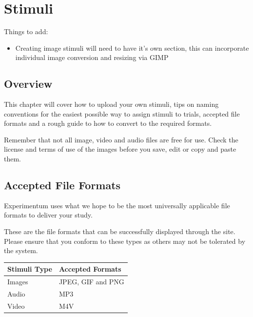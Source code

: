 \documentclass[]{book}
\providecommand{\tightlist}{%
  \setlength{\itemsep}{0pt}\setlength{\parskip}{0pt}}
\begin{document}
\hypertarget{stimuli}{\chapter{Stimuli}\label{stimuli}}

\begin{warning}
Things to add:

\begin{itemize}
\tightlist
\item
  Creating image stimuli will need to have it's own section, this can
  incorporate individual image conversion and resizing via GIMP
\end{itemize}
\end{warning}

\section{Overview}\label{overview-1}

This chapter will cover how to upload your own stimuli, tips on naming
conventions for the easiest possible way to assign stimuli to trials,
accepted file formats and a rough guide to how to convert to the
required formats.

\begin{warning}
Remember that not all image, video and audio files are free for use.
Check the license and terms of use of the images before you save, edit
or copy and paste them.
\end{warning}

\section{Accepted File Formats}\label{accepted-file-formats}

Experimentum uses what we hope to be the most universally applicable
file formats to deliver your study.

These are the file formats that can be successfully displayed through
the site. Please ensure that you conform to these types as others may
not be tolerated by the system.

\begin{tabular}{l|l}
\hline
Stimuli Type & Accepted Formats\\
\hline
Images & JPEG, GIF and PNG\\
\hline
Audio & MP3\\
\hline
Video & M4V\\
\hline
\end{tabular}
\end{document}
